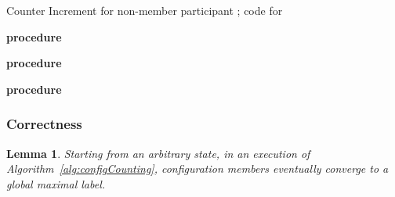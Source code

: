 \documentclass[11pt]{article}
\newtheorem{lemma}[theorem]{Lemma}
\begin{document}
\begin{algorithm*}[t!]
   \caption{Counter Increment for non-member participant ; code for }

\label{alg:cntrIncrNonMember}
\begin{footnotesize}


{\bf procedure} \label{CtNM:beginIncrement} \label{CtNM:end}

{\bf procedure}  \label{CtNM:qReadDef}	


{\bf procedure}  \label{CtNM:qWriteSend}
\end{footnotesize}
\end{algorithm*} 




\subsubsection{Correctness}
\begin{lemma}
\label{thCNT:convLab}
Starting from an arbitrary state, in an execution  of Algorithm~\ref{alg:configCounting}, configuration members eventually converge to a global maximal label.
\end{lemma}
\end{document}
